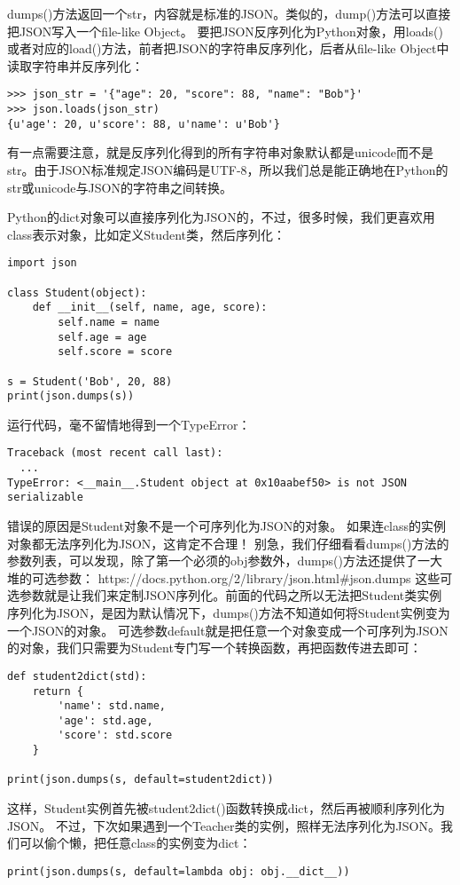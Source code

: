 \documentclass[twoside,11pt]{book}
\begin{document}
dumps()方法返回一个str，内容就是标准的JSON。类似的，dump()方法可以直接把JSON写入一个file-like Object。
要把JSON反序列化为Python对象，用loads()或者对应的load()方法，前者把JSON的字符串反序列化，后者从file-like Object中读取字符串并反序列化：
\begin{lstlisting}
>>> json_str = '{"age": 20, "score": 88, "name": "Bob"}'
>>> json.loads(json_str)
{u'age': 20, u'score': 88, u'name': u'Bob'}
\end{lstlisting}

有一点需要注意，就是反序列化得到的所有字符串对象默认都是unicode而不是str。由于JSON标准规定JSON编码是UTF-8，所以我们总是能正确地在Python的str或unicode与JSON的字符串之间转换。


Python的dict对象可以直接序列化为JSON的{}，不过，很多时候，我们更喜欢用class表示对象，比如定义Student类，然后序列化：
\begin{lstlisting}
import json

class Student(object):
    def __init__(self, name, age, score):
        self.name = name
        self.age = age
        self.score = score

s = Student('Bob', 20, 88)
print(json.dumps(s))
\end{lstlisting}

运行代码，毫不留情地得到一个TypeError：
\begin{lstlisting}
Traceback (most recent call last):
  ...
TypeError: <__main__.Student object at 0x10aabef50> is not JSON serializable
\end{lstlisting}

错误的原因是Student对象不是一个可序列化为JSON的对象。
如果连class的实例对象都无法序列化为JSON，这肯定不合理！
别急，我们仔细看看dumps()方法的参数列表，可以发现，除了第一个必须的obj参数外，dumps()方法还提供了一大堆的可选参数：
https://docs.python.org/2/library/json.html\#json.dumps
这些可选参数就是让我们来定制JSON序列化。前面的代码之所以无法把Student类实例序列化为JSON，是因为默认情况下，dumps()方法不知道如何将Student实例变为一个JSON的{}对象。
可选参数default就是把任意一个对象变成一个可序列为JSON的对象，我们只需要为Student专门写一个转换函数，再把函数传进去即可：
\begin{lstlisting}
def student2dict(std):
    return {
        'name': std.name,
        'age': std.age,
        'score': std.score
    }

print(json.dumps(s, default=student2dict))
\end{lstlisting}

这样，Student实例首先被student2dict()函数转换成dict，然后再被顺利序列化为JSON。
不过，下次如果遇到一个Teacher类的实例，照样无法序列化为JSON。我们可以偷个懒，把任意class的实例变为dict：
\begin{lstlisting}
print(json.dumps(s, default=lambda obj: obj.__dict__))
\end{lstlisting}
\end{document}
